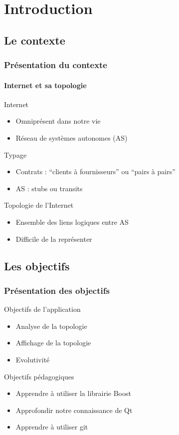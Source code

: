\section*{Introduction}

\subsection*{Le contexte}
\frame
{
\frametitle{Pr\'esentation du contexte}
\framesubtitle{Internet et sa topologie}
\vfill
\begin{block}{Internet}
\begin{itemize}
\item Omnipr\'esent dans notre vie
\item  R\'eseau de systèmes autonomes (AS)
\end{itemize}
\end{block}
\vfill
\begin{block}{Typage}
\begin{itemize}
\item Contrats : ``clients à fournisseurs'' ou ``pairs à pairs''
\item AS : stubs ou transits
\end{itemize}
\end{block}
\vfill
\begin{block}{Topologie de l'Internet}
\begin{itemize}
\item Ensemble des liens logiques entre AS
\item Difficile de la repr\'esenter
\end{itemize}
\end{block}
\vfill
}

\subsection*{Les objectifs}
\frame
{
\frametitle{Pr\'esentation des objectifs}

\begin{block}{Objectifs de l'application}
\begin{itemize}
 \item Analyse de la topologie
 \item Affichage de la topologie
 \item Evolutivit\'e
\end{itemize}
\end{block}

\begin{block}{Objectifs p\'edagogiques}
\begin{itemize}
 \item Apprendre \`a utiliser la librairie Boost
 \item Approfondir notre connaissance de Qt
 \item Apprendre \`a utiliser git
\end{itemize}
\end{block}
}
